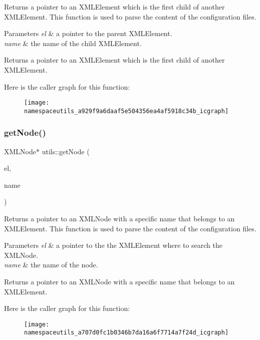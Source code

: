 Returns a pointer to an X\+M\+L\+Element which is the first child of another X\+M\+L\+Element. This function is used to parse the content of the configuration files. 
\begin{DoxyParams}{Parameters}
{\em el} & a pointer to the parent X\+M\+L\+Element. \\
\hline
{\em name} & the name of the child X\+M\+L\+Element. \\
\hline
\end{DoxyParams}
\begin{DoxyReturn}{Returns}
a pointer to an X\+M\+L\+Element which is the first child of another X\+M\+L\+Element. 
\end{DoxyReturn}
Here is the caller graph for this function\+:\nopagebreak
\begin{figure}[H]
\begin{center}
\leavevmode
\texttt{[image: namespaceutils\_a929f9a6daaf5e504356ea4af5918c34b\_icgraph]}
\end{center}
\end{figure}
\mbox{\label{namespaceutils_a707d0fc1b0346b7da16a6f7714a7f24d}} 
\subsubsection{\texorpdfstring{get\+Node()}{getNode()}}
{\footnotesize\ttfamily X\+M\+L\+Node$\ast$ utils\+::get\+Node (\begin{DoxyParamCaption}\item[{X\+M\+L\+Element $\ast$}]{el,  }\item[{const char $\ast$}]{name }\end{DoxyParamCaption})}

Returns a pointer to an X\+M\+L\+Node with a specific name that belongs to an X\+M\+L\+Element. This function is used to parse the content of the configuration files. 
\begin{DoxyParams}{Parameters}
{\em el} & a pointer to the the X\+M\+L\+Element where to search the X\+M\+L\+Node. \\
\hline
{\em name} & the name of the node. \\
\hline
\end{DoxyParams}
\begin{DoxyReturn}{Returns}
a pointer to an X\+M\+L\+Node with a specific name that belongs to an X\+M\+L\+Element. 
\end{DoxyReturn}
Here is the caller graph for this function\+:\nopagebreak
\begin{figure}[H]
\begin{center}
\leavevmode
\texttt{[image: namespaceutils\_a707d0fc1b0346b7da16a6f7714a7f24d\_icgraph]}
\end{center}
\end{figure}
\mbox{\label{namespaceutils_a90cdccb9260004c67a61003d648b4e14}} 
